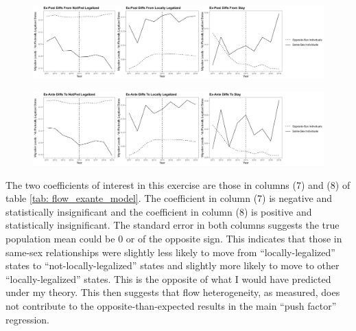 \documentclass[12pt,letterpaper]{article}
\begin{document}
\begin{centering}
\begin{figure}
    \includegraphics[width=1\linewidth]{outputs/summary_stats/flows_post_diffs.png}
    \caption{}
    \label{fig: flows_post_diffs}
\end{figure}

\begin{figure}
    \includegraphics[width=1\linewidth]{outputs/summary_stats/flows_ante_diffs.png}
    \caption{}
    \label{fig: flows_ante_diffs}
\end{figure}
\end{centering}

 The two coefficients of interest in this exercise are those in columns (7) and (8) of table \ref{tab: flow_exante_model}. The coefficient in column (7) is negative and statistically insignificant and the coefficient in column (8) is positive and statistically insignificant. The standard error in both columns suggests the true population mean could be 0 or of the opposite sign. This indicates that those in same-sex relationships were slightly less likely to move from “locally-legalized” states to “not-locally-legalized” states and slightly more likely to move to other “locally-legalized” states. This is the opposite of what I would have predicted under my theory. This then suggests that flow heterogeneity, as measured, does not contribute to the opposite-than-expected results in the main “push factor” regression.


\begin{landscape}
\begin{scriptsize}
\begin{table}[h] %
    \centering
    
    \caption{}
    \label{tab: flow_expost_model}
\end{table}
\begin{table}[h]
    \centering
    
    \caption{}
    \label{tab: flow_exante_model}
\end{table}
\end{scriptsize}
\end{landscape}
\end{document}
